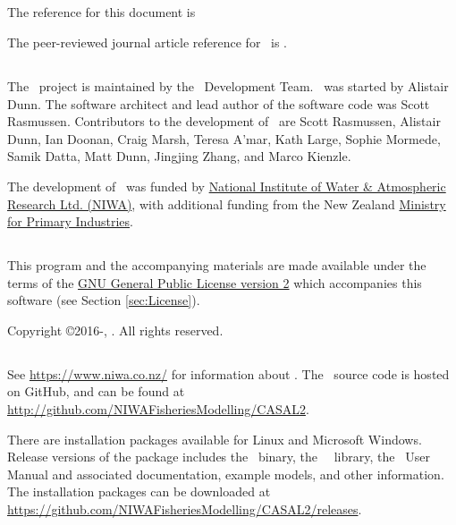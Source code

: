 \subsection{}

The reference for this document is \ManualRef

The peer-reviewed journal article reference for \CNAME\ is \citep{doonan_casal2}.

\subsection{}

The \CNAME\ project is maintained by the \CNAME\ Development Team. \CNAME\ was started by Alistair Dunn. The software architect and lead author of the software code was Scott Rasmussen. Contributors to the development of \CNAME\ are Scott Rasmussen, Alistair Dunn, Ian Doonan, Craig Marsh, Teresa A'mar, Kath Large, Sophie Mormede, Samik Datta, Matt Dunn, Jingjing Zhang, and Marco Kienzle.

The development of \CNAME\ was funded by \href{http://www.niwa.co.nz}{National Institute of Water \& Atmospheric Research Ltd. (NIWA)}, with additional funding from the New Zealand \href{http://www.mpi.govt.nz}{Ministry for Primary Industries}.

\subsection{}

This program and the accompanying materials are made available under the terms of the \href{http://www.opensource.org/licenses/GPL-2.0}{GNU General Public License version 2} which accompanies this software (see Section \ref{sec:License}).

Copyright \copyright 2016-\SourceControlYearDoc, \href{https://www.niwa.co.nz}{\Organisation}. All rights reserved.

\subsection{}

See \url{https://www.niwa.co.nz/} for information about \CNAME. The \CNAME\ source code is hosted on GitHub, and can be found at \url{http://github.com/NIWAFisheriesModelling/CASAL2}.

There are installation packages available for Linux and Microsoft Windows. Release versions of the package includes the \CNAME\ binary, the \CNAME\ \R\ library, the \CNAME\ User Manual and associated documentation, example models, and other information. The installation packages can be downloaded at \url{https://github.com/NIWAFisheriesModelling/CASAL2/releases}.

